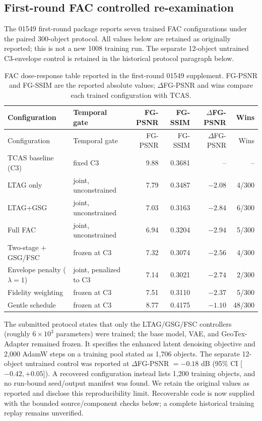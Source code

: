 \documentclass[11pt]{article}
\begin{document}
\clearpage
\subsection*{First-round FAC controlled re-examination}
The 01549 first-round package reports seven trained FAC configurations under the paired 300-object protocol. All values below are retained as originally reported; this is not a new 1008 training run. The separate 12-object untrained C3-envelope control is retained in the historical protocol paragraph below.

\begin{longtable}{p{3.3cm}p{3.5cm}rrrr}
\caption{FAC dose-response table reported in the first-round 01549 supplement. FG-PSNR and FG-SSIM are the reported absolute values; $\Delta$FG-PSNR and wins compare each trained configuration with TCAS.}\label{tab:fac-dose-response}\\
\toprule
Configuration & Temporal gate & FG-PSNR & FG-SSIM & $\Delta$FG-PSNR & Wins \\
\midrule\endfirsthead
\toprule
Configuration & Temporal gate & FG-PSNR & FG-SSIM & $\Delta$FG-PSNR & Wins \\
\midrule\endhead
TCAS baseline (C3) & fixed C3 & 9.88 & 0.3681 & -- & -- \\
LTAG only & joint, unconstrained & 7.79 & 0.3487 & $-2.08$ & 4/300 \\
LTAG+GSG & joint, unconstrained & 7.03 & 0.3163 & $-2.84$ & 6/300 \\
Full FAC & joint, unconstrained & 6.94 & 0.3204 & $-2.94$ & 5/300 \\
Two-stage + GSG/FSC & frozen at C3 & 7.32 & 0.3074 & $-2.56$ & 4/300 \\
Envelope penalty ($\lambda=1$) & joint, penalized to C3 & 7.14 & 0.3021 & $-2.74$ & 2/300 \\
Fidelity weighting & frozen at C3 & 7.51 & 0.3110 & $-2.37$ & 5/300 \\
Gentle schedule & frozen at C3 & 8.77 & 0.4175 & $-1.10$ & 48/300 \\
\bottomrule
\end{longtable}

The submitted protocol states that only the LTAG/GSG/FSC controllers (roughly $6\times10^3$ parameters) were trained; the base model, VAE, and GeoTex-Adapter remained frozen. It specifies the enhanced latent denoising objective and 2,000 AdamW steps on a training pool stated as 1,706 objects. The separate 12-object untrained control was reported at $\Delta$FG-PSNR $=-0.18$ dB (95\% CI [$-0.42,+0.05$]). A recovered configuration instead lists 1,200 training objects, and no run-bound seed/output manifest was found. We retain the original values as reported and disclose this reproducibility limit. Recoverable code is now supplied with the bounded source/component checks below; a complete historical training replay remains unverified.
\end{document}

